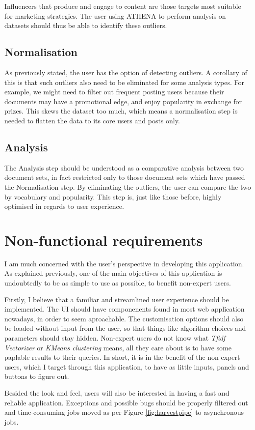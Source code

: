 Influencers that produce and engage to content are those targets most suitable for marketing strategies. The user using ATHENA to perform analysis on datasets should thus be able to identify these outliers.

\subsection{Normalisation}
As previously stated, the user has the option of detecting outliers. A corollary of this is that such outliers also need to be eliminated for some analysis types. For example, we might need to filter out frequent posting users because their documents may have a promotional edge, and enjoy popularity in exchange for prizes. This skews the dataset too much, which means a normalisation step is needed to flatten the data to its core users and posts only.

\subsection{Analysis}
The Analysis step should be understood as a comparative analysis between two document sets, in fact restricted only to those document sets which have passed the Normalisation step. By eliminating the outliers, the user can compare the two by vocabulary and popularity. This step is, just like those before, highly optimised in regards to user experience.

\section{Non-functional requirements}
I am much concerned with the user's perspective in developing this application. As explained previously, one of the main objectives of this application is undoubtedly to be as simple to use as possible, to benefit non-expert users.

Firstly, I believe that a familiar and streamlined user experience should be implemented. The UI should have componenents found in most web application nowadays, in order to seem aproachable. The customisation options should also be loaded without input from the user, so that things like algorithm choices and parameters should stay hidden. Non-expert users do not know what \emph{Tfidf Vectorizer} or \emph{KMeans clustering} means, all they care about is to have some paplable results to their queries. In short, it is in the benefit of the non-expert users, which I target through this application, to have as little inputs, panels and buttons to figure out.

Besided the look and feel, users will also be interested in having a fast and reliable application. Exceptions and possible bugs should be properly filtered out and time-consuming jobs moved as per Figure \ref{fig:harvestpipe} to asynchronous jobs.